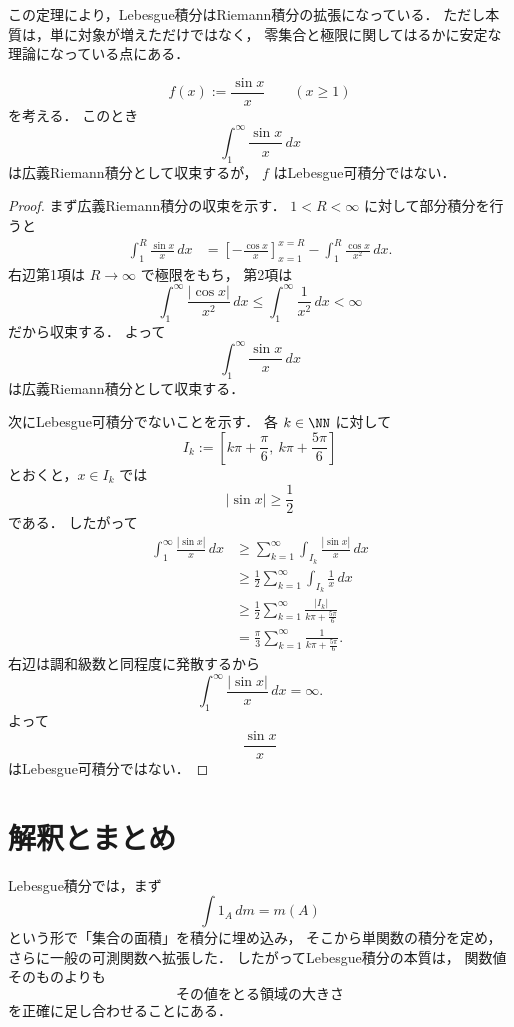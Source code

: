 \begin{remark}
この定理により，Lebesgue積分はRiemann積分の拡張になっている．
ただし本質は，単に対象が増えただけではなく，
零集合と極限に関してはるかに安定な理論になっている点にある．
\end{remark}

\begin{example}[広義Riemann積分可能だがLebesgue積分可能でない関数]
\[
f(x):=\frac{\sin x}{x}
\qquad (x \ge 1)
\]
を考える．
このとき
\[
\int_1^{\infty} \frac{\sin x}{x}\,dx
\]
は広義Riemann積分として収束するが，
$f$ はLebesgue可積分ではない．
\end{example}
\begin{proof}
まず広義Riemann積分の収束を示す．
$1<R<\infty$ に対して部分積分を行うと
\begin{align*}
\int_1^R \frac{\sin x}{x}\,dx
&=
\left[-\frac{\cos x}{x}\right]_{x=1}^{x=R}
-\int_1^R \frac{\cos x}{x^2}\,dx.
\end{align*}
右辺第1項は $R\to\infty$ で極限をもち，
第2項は
\[
\int_1^{\infty}\frac{|\cos x|}{x^2}\,dx
\le
\int_1^{\infty}\frac{1}{x^2}\,dx
<
\infty
\]
だから収束する．
よって
\[
\int_1^{\infty} \frac{\sin x}{x}\,dx
\]
は広義Riemann積分として収束する．

次にLebesgue可積分でないことを示す．
各 $k \in \NN$ に対して
\[
I_k:=
\left[k\pi+\frac{\pi}{6},\ k\pi+\frac{5\pi}{6}\right]
\]
とおくと，$x \in I_k$ では
\[
|\sin x|\ge \frac12
\]
である．
したがって
\begin{align*}
\int_1^{\infty}\frac{|\sin x|}{x}\,dx
&\ge
\sum_{k=1}^{\infty}\int_{I_k}\frac{|\sin x|}{x}\,dx \\
&\ge
\frac12\sum_{k=1}^{\infty}\int_{I_k}\frac{1}{x}\,dx \\
&\ge
\frac12\sum_{k=1}^{\infty}
\frac{|I_k|}{k\pi+\frac{5\pi}{6}} \\
&=
\frac{\pi}{3}\sum_{k=1}^{\infty}\frac{1}{k\pi+\frac{5\pi}{6}}.
\end{align*}
右辺は調和級数と同程度に発散するから
\[
\int_1^{\infty}\frac{|\sin x|}{x}\,dx=\infty.
\]
よって
\[
\frac{\sin x}{x}
\]
はLebesgue可積分ではない．
\end{proof}

\section{解釈とまとめ}

Lebesgue積分では，まず
\[
\int 1_A\,dm = m(A)
\]
という形で「集合の面積」を積分に埋め込み，
そこから単関数の積分を定め，
さらに一般の可測関数へ拡張した．
したがってLebesgue積分の本質は，
関数値そのものよりも
\[
\text{その値をとる領域の大きさ}
\]
を正確に足し合わせることにある．

